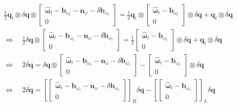 \begin{equation}
\label{eqn:3.29}
\begin{aligned}
&  \frac{1}{2} \mathbf{q}_{t} \otimes \delta \mathbf{q} \otimes \left[ \begin{array}{c}{\hat{\bm{\omega}}_{t}-\mathbf{b}_{\omega_{t}}-\mathbf{n}_{\omega}-\delta \mathbf{b}_{\omega_{t}}} \\ {0}\end{array}\right]
= \frac{1}{2} \mathbf{q}_{t} \otimes \left[ \begin{array}{c}{\hat{\bm{\omega}}_{t}-\mathbf{b}_{\omega_{t}}} \\ {0}\end{array}\right] \otimes \delta \mathbf{q}+\mathbf{q}_{t} \otimes \dot{\delta \mathbf{q}} \\   
& \Leftrightarrow \quad \frac{1}{2} \delta \mathbf{q} \otimes \left[ \begin{array}{c}{\hat{\bm{\omega}}_{t}-\mathbf{b}_{\omega_{t}}-\mathbf{n}_{\omega}-\delta \mathbf{b}_{\omega_{t}}} \\ {0}\end{array}\right]
= \frac{1}{2} \left[ \begin{array}{c}{\hat{\bm{\omega}}_{t}-\mathbf{b}_{\omega_{t}}} \\ {0}\end{array}\right] \otimes \delta \mathbf{q}+\mathbf{q}_{t} \otimes \dot{\delta \mathbf{q}} \\
& \Leftrightarrow \quad 2\dot{\delta \mathbf{q}} = \delta \mathbf{q} \otimes \left[ \begin{array}{c}{\hat{\bm{\omega}}_{t}-\mathbf{b}_{\omega_{t}}-\mathbf{n}_{\omega}-\delta \mathbf{b}_{\omega_{t}}} \\ {0}\end{array}\right]
- \left[ \begin{array}{c}{\hat{\bm{\omega}}_{t}-\mathbf{b}_{\omega_{t}}} \\ {0}\end{array}\right] \otimes \delta \mathbf{q} \\
& \Leftrightarrow \quad 2\dot{\delta \mathbf{q}} = \left[\left[ \begin{array}{c}{\hat{\bm{\omega}}_{t}-\mathbf{b}_{\omega_{t}}-\mathbf{n}_{\omega}-\delta \mathbf{b}_{\omega_{t}}} \\ {0}\end{array}\right]\right]_R \delta \mathbf{q}
- \left[\left[ \begin{array}{c}{\hat{\bm{\omega}}_{t}-\mathbf{b}_{\omega_{t}}} \\ {0}\end{array}\right]\right]_L \delta \mathbf{q} \\

\end{aligned}
\end{equation}

